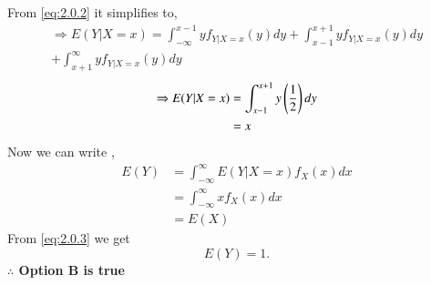 \documentclass[journal,12pt,twocolumn]{IEEEtran}
\begin{document}
From \ref{eq:2.0.2} it simplifies to,
\begin{multline}
    \Rightarrow E(Y|X=x)=\int_{-\infty}^{x-1}yf_{Y|X=x}(y)dy+\int_{x-1}^{x+1}yf_{Y|X=x}(y)dy\\+\int_{x+1}^{\infty}yf_{Y|X=x}(y)dy
\end{multline}
\begin{align}
    \Rightarrow E(Y|X=x)&=\int_{x-1}^{x+1}y\left(\frac{1}{2}\right)dy\\
    &=x
\end{align}
Now we can write ,\\
\begin{align}
    E(Y)&=\int_{-\infty}^{\infty}E(Y|X=x)f_{X}(x)dx\\
    &=\int_{-\infty}^{\infty}xf_{X}(x)dx\\
    &=E(X)
\end{align}
From \ref{eq:2.0.3} we get 
\begin{equation}
    E(Y)=1.
\end{equation}
\textbf{$\therefore$ Option B is true}

\end{document}
